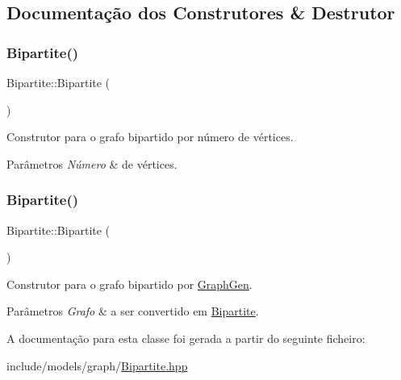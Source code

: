 \subsection{Documentação dos Construtores \& Destrutor}
\mbox{\label{classBipartite_a1dfec46c393c2c1b8141250d26968673}} 
\subsubsection{\texorpdfstring{Bipartite()}{Bipartite()}\hspace{0.1cm}{\footnotesize\ttfamily [1/2]}}
{\footnotesize\ttfamily Bipartite\+::\+Bipartite (\begin{DoxyParamCaption}\item[{int}]{ }\end{DoxyParamCaption})}

Construtor para o grafo bipartido por número de vértices. 
\begin{DoxyParams}{Parâmetros}
{\em Número} & de vértices. \\
\hline
\end{DoxyParams}
\mbox{\label{classBipartite_a5535fa6da516192c5ec964b37db63e55}} 
\subsubsection{\texorpdfstring{Bipartite()}{Bipartite()}\hspace{0.1cm}{\footnotesize\ttfamily [2/2]}}
{\footnotesize\ttfamily Bipartite\+::\+Bipartite (\begin{DoxyParamCaption}\item[{\mbox{\hyperlink{classGraphGen}{Graph\+Gen}} \&}]{ }\end{DoxyParamCaption})}

Construtor para o grafo bipartido por \mbox{\hyperlink{classGraphGen}{Graph\+Gen}}. 
\begin{DoxyParams}{Parâmetros}
{\em Grafo} & a ser convertido em \mbox{\hyperlink{classBipartite}{Bipartite}}. \\
\hline
\end{DoxyParams}


A documentação para esta classe foi gerada a partir do seguinte ficheiro\+:\begin{DoxyCompactItemize}
\item 
include/models/graph/\mbox{\hyperlink{Bipartite_8hpp}{Bipartite.\+hpp}}\end{DoxyCompactItemize}
